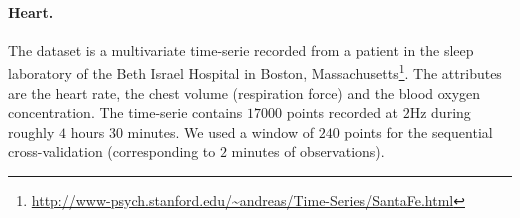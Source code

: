 \paragraph{Heart.}
The dataset is a multivariate time-serie recorded from a patient in the sleep
laboratory of the Beth Israel Hospital in Boston, Massachusetts\footnote{%
\url{http://www-psych.stanford.edu/~andreas/Time-Series/SantaFe.html}}.
The attributes are the heart rate, the chest volume (respiration force) and the
blood oxygen concentration. The time-serie contains $17000$ points recorded at
$2$Hz during roughly $4$ hours $30$ minutes. We used a window of $240$ points
for the sequential cross-validation (corresponding to $2$ minutes of
observations).
\begin{table}[htb]
    \caption{SCV-MSE and computation times for ORFFVAR, VAR(1) and OKVAR on
    real datasets.\label{table:real_data}}
\end{table}

